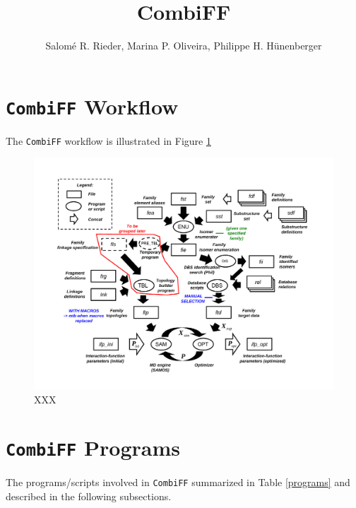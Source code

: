 \documentclass[a4paper,11pt]{article}
\title{CombiFF}
\author{Salom\'e R. Rieder, Marina P. Oliveira, Philippe H. Hünenberger}
\date{}
\begin{document}
\pagestyle{plain}
\maketitle

\newcommand{\vers}{\texttt{v\%\%}}
\newcommand{\fami}{\texttt{\#\#\#\#}}


\section{\texttt{CombiFF} Workflow}

The \texttt{CombiFF} workflow is illustrated in Figure \ref{cff_workflow}
%
\begin{figure}[h]
\begin{center}
  \includegraphics[clip=true,scale=0.6]{fig/cff_workflow.pdf}
\end{center}
\caption{XXX}
\label{cff_workflow}
\end{figure}
%

\section{\texttt{CombiFF} Programs}

The programs/scripts involved in \texttt{CombiFF} 
summarized in Table \ref{programs} and described 
in the following subsections.
\end{document}
